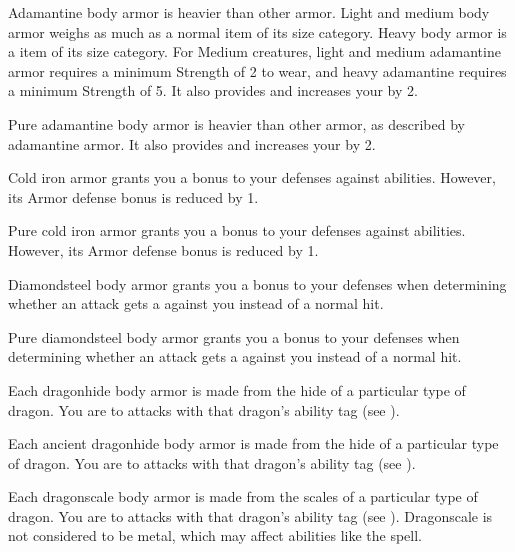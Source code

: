       Adamantine body armor is heavier than other armor.
      Light and medium body armor weighs as much as a normal item of its size category.
      Heavy body armor is a  item of its size category.
      For Medium creatures, light and medium adamantine armor requires a minimum Strength of 2 to wear, and heavy adamantine requires a minimum Strength of 5.
      It also provides   and increases your  by 2.

       Pure adamantine body armor is heavier than other armor, as described by adamantine armor.
      It also provides   and increases your  by 2.

       Cold iron armor grants you a  bonus to your defenses against \magical abilities.
      However, its Armor defense bonus is reduced by 1.

       Pure cold iron armor grants you a  bonus to your defenses against \magical abilities.
      However, its Armor defense bonus is reduced by 1.

       Diamondsteel body armor grants you a  bonus to your defenses when determining whether an attack gets a  against you instead of a normal hit.

       Pure diamondsteel body armor grants you a  bonus to your defenses when determining whether an attack gets a  against you instead of a normal hit.

       Each dragonhide body armor is made from the hide of a particular type of dragon.
      You are  to attacks with that dragon's ability tag (see ).

       Each ancient dragonhide body armor is made from the hide of a particular type of dragon.
      You are  to attacks with that dragon's ability tag (see ).

       Each dragonscale body armor is made from the scales of a particular type of dragon.
      You are  to attacks with that dragon's ability tag (see ).
      Dragonscale is not considered to be metal, which may affect abilities like the  spell.

